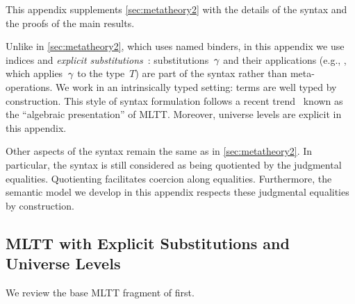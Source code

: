 This appendix supplements \cref{sec:metatheory2} with the details of the syntax
and the proofs of the main results.

Unlike in \cref{sec:metatheory2}, which uses named binders, in this appendix we
use \citeauthor{debruijn1964} indices and \emph{explicit
substitutions}~\cite{abadi1989subst,substcalculus}:
substitutions~$\gamma$ and their applications (e.g., , which
applies~$\gamma$ to the type~$T$) are part of the syntax rather than
meta-operations. 
We work in an intrinsically typed setting: terms are well typed by construction.
This style of syntax formulation follows a recent
trend~\cite{altkap2016,coquand2018canonicity,gratzer-sterling-birkedal-2019}
known as the ``algebraic presentation'' of MLTT.
Moreover, universe levels are explicit in this appendix. 


Other aspects of the syntax remain the same as in \cref{sec:metatheory2}.
In particular,
the syntax is still considered as being quotiented by the judgmental equalities.
Quotienting facilitates coercion along equalities.
Furthermore, the semantic model we develop in this appendix respects these
judgmental equalities by construction.



\subsection{MLTT with Explicit Substitutions and Universe Levels}
\label{sec:mltt-full}

We review the base MLTT fragment of \TT first.


